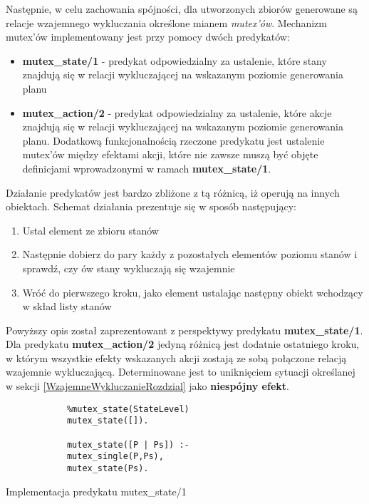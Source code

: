     
    Następnie, w celu zachowania spójności, dla utworzonych zbiorów 
    generowane są relacje wzajemnego wykluczania określone mianem \textit{mutex'ów}. Mechanizm mutex'ów implementowany jest przy pomocy dwóch predykatów:
    \begin{itemize}
        \item \textbf{mutex\_state/1} - predykat odpowiedzialny za ustalenie, które stany znajdują się w relacji wykluczającej na wskazanym 
        poziomie generowania planu
        \item \textbf{mutex\_action/2} - predykat odpowiedzialny za ustalenie, które akcje znajdują się w relacji wykluczającej na wskazanym
        poziomie generowania planu. Dodatkową funkcjonalnością rzeczone predykatu jest ustalenie mutex'ów między efektami akcji, które 
        nie zawsze muszą być objęte definicjami wprowadzonymi w ramach \textbf{mutex\_state/1}.
    \end{itemize}

    Działanie predykatów jest bardzo zbliżone z tą różnicą, iż operują na innych obiektach. Schemat działania prezentuje się w sposób następujący:
    \begin{enumerate}
        \item Ustal element ze zbioru stanów
        \item Następnie dobierz do pary każdy z pozostałych elementów poziomu stanów i sprawdź, czy ów stany wykluczają się wzajemnie
        \item Wróć do pierwszego kroku, jako element ustalając następny obiekt wchodzący w skład listy stanów
    \end{enumerate}

    Powyższy opis został zaprezentowant z perspektywy predykatu \textbf{mutex\_state/1}. Dla predykatu \textbf{mutex\_action/2} jedyną różnicą jest 
    dodatnie ostatniego kroku, w którym wszystkie efekty wskazanych akcji zostają ze sobą połączone relacją wzajemnie wykluczającą. Determinowane 
    jest to uniknięciem sytuacji określanej w sekcji \ref{WzajemneWykluczanieRozdzial} jako \textbf{niespójny efekt}.

    \begin{listing}[H]
        \begin{verbatim}
            %mutex_state(StateLevel)
            mutex_state([]).

            mutex_state([P | Ps]) :-
            mutex_single(P,Ps),
            mutex_state(Ps).
    \end{verbatim}
    \caption{Implementacja predykatu mutex\_state/1}
    \end{listing}

